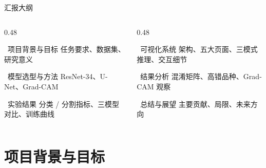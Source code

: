 \documentclass[aspectratio=169, 11pt]{ctexbeamer}
\begin{document}
\begin{frame}{汇报大纲}
\vspace{0.4em}
\begin{columns}[T]
  \begin{column}{0.48\linewidth}
    \begin{block}{\faRocket\ 项目背景与目标}
      \footnotesize 任务要求、数据集、研究意义
    \end{block}
    \begin{block}{\faCube\ 模型选型与方法}
      \footnotesize ResNet-34、U-Net、Grad-CAM
    \end{block}
    \begin{block}{\faChartBar\ 实验结果}
      \footnotesize 分类 / 分割指标、三模型对比、训练曲线
    \end{block}
  \end{column}
  \begin{column}{0.48\linewidth}
    \begin{block}{\faDesktop\ 可视化系统}
      \footnotesize 架构、五大页面、三模式推理、交互细节
    \end{block}
    \begin{block}{\faSearch\ 结果分析}
      \footnotesize 混淆矩阵、高错品种、Grad-CAM 观察
    \end{block}
    \begin{block}{\faCheckCircle\ 总结与展望}
      \footnotesize 主要贡献、局限、未来方向
    \end{block}
  \end{column}
\end{columns}
\end{frame}

\section{项目背景与目标}
\end{document}
